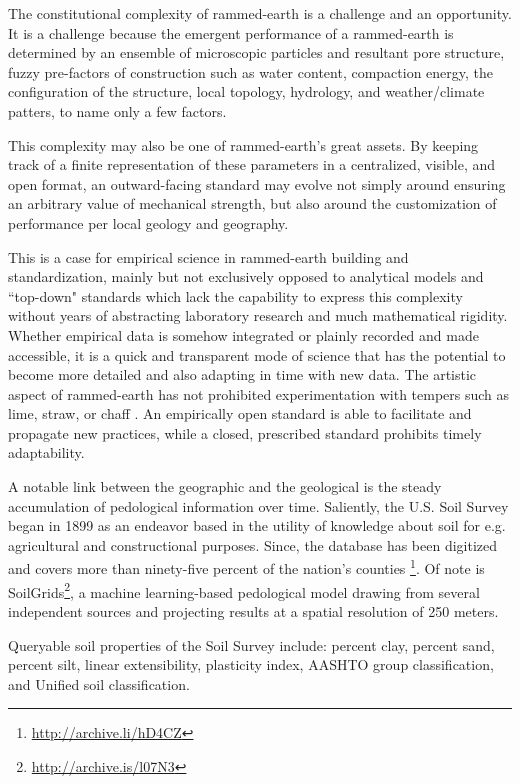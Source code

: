 The constitutional complexity of rammed-earth is a challenge and an opportunity. It is a challenge because the emergent performance of a rammed-earth is determined by an ensemble of microscopic particles and resultant pore structure, fuzzy pre-factors of construction such as water content, compaction energy, the configuration of the structure, local topology, hydrology, and weather/climate patters, to name only a few factors.

This complexity may also be one of rammed-earth's great assets. By keeping track of a finite representation of these parameters in a centralized, visible, and open format, an outward-facing standard may evolve not simply around ensuring an arbitrary value of mechanical strength, but also around the customization of performance per local geology and geography.

This is a case for empirical science in rammed-earth building and standardization, mainly but not exclusively opposed to analytical models and ``top-down" standards which lack the capability to express this complexity without years of abstracting laboratory research and much mathematical rigidity. Whether empirical data is somehow integrated or plainly recorded and made accessible, it is a quick and transparent mode of science that has the potential to become more detailed and also adapting in time with new data. The artistic aspect of rammed-earth has not prohibited experimentation with tempers such as lime, straw, or chaff \cite{RAMMEDEARTHHOUSE}. An empirically open standard is able to facilitate and propagate new practices, while a closed, prescribed standard prohibits timely adaptability.

A notable link between the geographic and the geological is the steady accumulation of pedological information over time. Saliently, the U.S. Soil Survey began in 1899 as an endeavor based in the utility of knowledge about soil for e.g. agricultural and constructional purposes. Since, the database has been digitized and covers more than ninety-five percent of the nation's counties \footnote{\url{http://archive.li/hD4CZ}}. Of note is SoilGrids\footnote{\url{http://archive.is/l07N3}}, a machine learning-based pedological model drawing from several independent sources and projecting results at a spatial resolution of 250 meters.

Queryable soil properties of the Soil Survey include: percent clay, percent sand, percent silt, linear extensibility, plasticity index, AASHTO group classification, and Unified soil classification.


